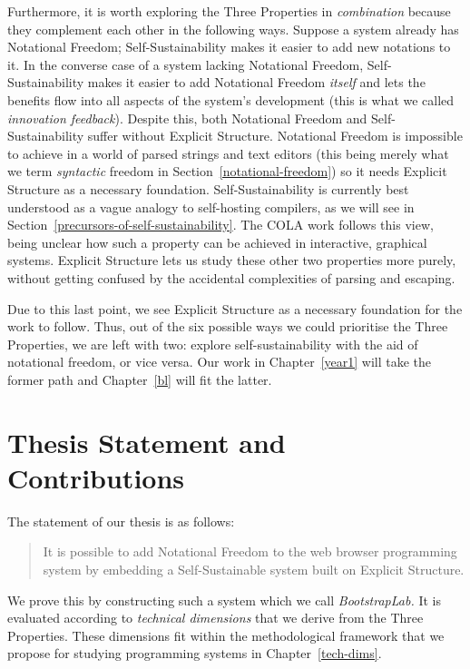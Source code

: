 Furthermore, it is worth exploring the Three Properties in
\emph{combination} because they complement each other in the following
ways. Suppose a system already has Notational Freedom;
Self-Sustainability makes it easier to add new notations to it. In the
converse case of a system lacking Notational Freedom,
Self-Sustainability makes it easier to add Notational Freedom
\emph{itself} and lets the benefits flow into all aspects of the
system's development (this is what we called \emph{innovation
feedback}). Despite this, both Notational Freedom and
Self-Sustainability suffer without Explicit Structure. Notational
Freedom is impossible to achieve in a world of parsed strings and text
editors (this being merely what we term \emph{syntactic} freedom in
Section~\ref{notational-freedom}) so it needs Explicit Structure as a
necessary foundation. Self-Sustainability is currently best understood
as a vague analogy to self-hosting compilers, as we will see in
Section~\ref{precursors-of-self-sustainability}. The COLA work follows
this view, being unclear how such a property can be achieved in
interactive, graphical systems. Explicit Structure lets us study these
other two properties more purely, without getting confused by the
accidental complexities of parsing and escaping.

Due to this last point, we see Explicit Structure as a necessary
foundation for the work to follow. Thus, out of the six possible ways we
could prioritise the Three Properties, we are left with two: explore
self-sustainability with the aid of notational freedom, or vice versa.
Our work in Chapter~\ref{year1} will take the former path and
Chapter~\ref{bl} will fit the latter.

\hypertarget{thesis-statement-and-contributions}{%
\section{Thesis Statement and
Contributions}\label{thesis-statement-and-contributions}}

The statement of our thesis is as follows:

\begin{quote}
It is possible to add Notational Freedom to the web browser programming
system by embedding a Self-Sustainable system built on Explicit
Structure.
\end{quote}

We prove this by constructing such a system which we call
\emph{BootstrapLab.} It is evaluated according to \emph{technical
dimensions} that we derive from the Three Properties. These dimensions
fit within the methodological framework that we propose for studying
programming systems in Chapter~\ref{tech-dims}.

